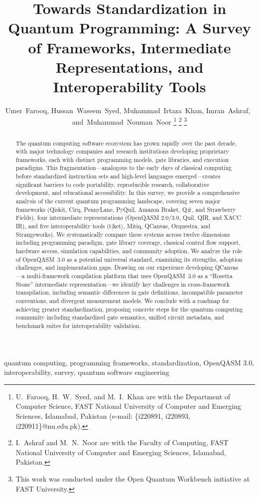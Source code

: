 \documentclass[journal]{IEEEtran}
\title{Towards Standardization in Quantum Programming: A Survey of Frameworks, Intermediate Representations, and Interoperability Tools}
\author{
  Umer~Farooq,
  Hussan~Waseem~Syed,
  Muhammad~Irtaza~Khan,
  Imran~Ashraf,~\IEEEmembership{Senior Member,~IEEE,}
  and~Muhammad~Nouman~Noor
  \thanks{U.~Farooq, H.~W.~Syed, and M.~I.~Khan are with the Department of Computer Science, FAST National University of Computer and Emerging Sciences, Islamabad, Pakistan (e-mail: \{i220891, i220893, i220911\}@nu.edu.pk).}
  \thanks{I.~Ashraf and M.~N.~Noor are with the Faculty of Computing, FAST National University of Computer and Emerging Sciences, Islamabad, Pakistan.}
  \thanks{This work was conducted under the Open Quantum Workbench initiative at FAST University.}
}
\begin{document}
\maketitle

\begin{abstract}
The quantum computing software ecosystem has grown rapidly over the past decade, with major technology companies and research institutions developing proprietary frameworks, each with distinct programming models, gate libraries, and execution paradigms. This fragmentation---analogous to the early days of classical computing before standardized instruction sets and high-level languages emerged---creates significant barriers to code portability, reproducible research, collaborative development, and educational accessibility. In this survey, we provide a comprehensive analysis of the current quantum programming landscape, covering seven major frameworks (Qiskit, Cirq, PennyLane, PyQuil, Amazon Braket, Q\#, and Strawberry Fields), four intermediate representations (OpenQASM 2.0/3.0, Quil, QIR, and XACC IR), and five interoperability tools (t$|$ket$\rangle$, Mitiq, QCanvas, Orquestra, and Strangeworks). We systematically compare these systems across twelve dimensions including programming paradigm, gate library coverage, classical control flow support, hardware access, simulation capabilities, and community adoption. We analyze the role of OpenQASM~3.0 as a potential universal standard, examining its strengths, adoption challenges, and implementation gaps. Drawing on our experience developing QCanvas---a multi-framework compilation platform that uses OpenQASM~3.0 as a ``Rosetta Stone'' intermediate representation---we identify key challenges in cross-framework transpilation, including semantic differences in gate definitions, incompatible parameter conventions, and divergent measurement models. We conclude with a roadmap for achieving greater standardization, proposing concrete steps for the quantum computing community including standardized gate semantics, unified circuit metadata, and benchmark suites for interoperability validation.
\end{abstract}

\begin{IEEEkeywords}
quantum computing, programming frameworks, standardization, OpenQASM 3.0, interoperability, survey, quantum software engineering
\end{IEEEkeywords}
\end{document}
